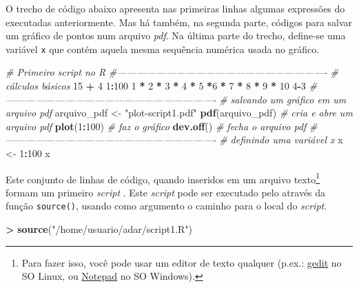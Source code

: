 \documentclass[]{book}
\newenvironment{Shaded}{\begin{snugshade}}{\end{snugshade}}
\newcommand{\KeywordTok}[1]{\textcolor[rgb]{0.13,0.29,0.53}{\textbf{#1}}}
\newcommand{\DecValTok}[1]{\textcolor[rgb]{0.00,0.00,0.81}{#1}}
\newcommand{\StringTok}[1]{\textcolor[rgb]{0.31,0.60,0.02}{#1}}
\newcommand{\CommentTok}[1]{\textcolor[rgb]{0.56,0.35,0.01}{\textit{#1}}}
\newcommand{\OperatorTok}[1]{\textcolor[rgb]{0.81,0.36,0.00}{\textbf{#1}}}
\newcommand{\NormalTok}[1]{#1}
\let\rmarkdownfootnote\footnote%
\def\footnote{\protect\rmarkdownfootnote}
\begin{document}
O trecho de código abaixo apresenta nas primeiras linhas algumas
expressões do executadas anteriormente. Mas há também, na segunda parte,
códigos para salvar um gráfico de pontos num arquivo \emph{pdf}. Na
última parte do trecho, define-se uma variável \texttt{x} que contém
aquela mesma sequência numérica usada no gráfico.

\begin{Shaded}
\begin{Highlighting}[]
\CommentTok{# Primeiro script no R}
\CommentTok{#----------------------------------------------------------------}
\CommentTok{# cálculos básicos}
\DecValTok{15} \OperatorTok{+}\StringTok{ }\DecValTok{4}
\DecValTok{1}\OperatorTok{:}\DecValTok{100}
\DecValTok{1} \OperatorTok{*}\StringTok{ }\DecValTok{2} \OperatorTok{*}\StringTok{ }\DecValTok{3} \OperatorTok{*}\StringTok{ }\DecValTok{4} \OperatorTok{*}\StringTok{ }\DecValTok{5} \OperatorTok{*}\DecValTok{6} \OperatorTok{*}\StringTok{ }\DecValTok{7} \OperatorTok{*}\StringTok{ }\DecValTok{8} \OperatorTok{*}\StringTok{ }\DecValTok{9} \OperatorTok{*}\StringTok{ }\DecValTok{10}
\DecValTok{4}\OperatorTok{-}\DecValTok{3}
\CommentTok{#----------------------------------------------------------------}
\CommentTok{# salvando um gráfico em um arquivo pdf}
\NormalTok{arquivo_pdf <-}\StringTok{ "plot-script1.pdf"}
\KeywordTok{pdf}\NormalTok{(arquivo_pdf)        }\CommentTok{# cria e abre um arquivo pdf}
\KeywordTok{plot}\NormalTok{(}\DecValTok{1}\OperatorTok{:}\DecValTok{100}\NormalTok{)             }\CommentTok{# faz o gráfico}
\KeywordTok{dev.off}\NormalTok{()               }\CommentTok{# fecha o arquivo pdf}
\CommentTok{#----------------------------------------------------------------}
\CommentTok{# definindo uma variável x}
\NormalTok{x <-}\StringTok{ }\DecValTok{1}\OperatorTok{:}\DecValTok{100}
\NormalTok{x}
\end{Highlighting}
\end{Shaded}

Este conjunto de linhas de código, quando inseridos em um arquivo
texto\footnote{Para fazer isso, você pode usar um editor de texto
  qualquer (p.ex.:
  \href{https://help.gnome.org/users/gedit/stable/index.html.pt_BR}{gedit}
  no SO Linux, ou
  \href{https://pt.wikipedia.org/wiki/Bloco_de_Notas}{Notepad} no SO
  Windows).} formam um primeiro \emph{script} . Este \emph{script} pode
ser executado pelo através da função \texttt{source()}, usando como
argumento o caminho para o local do \emph{script}.

\begin{Shaded}
\begin{Highlighting}[]
\OperatorTok{>}\StringTok{ }\KeywordTok{source}\NormalTok{(}\StringTok{"/home/usuario/adar/script1.R"}\NormalTok{)}
\end{Highlighting}
\end{Shaded}
\end{document}
